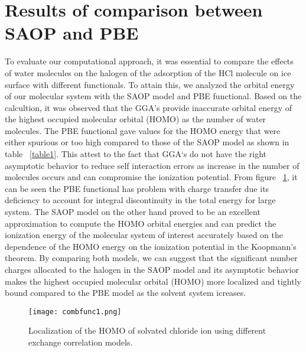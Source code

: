 \documentclass[a4paper,11pt]{report}
\begin{document}
\section{Results of comparison between SAOP and PBE}
To evaluate our computational approach, it was essential to compare the effects of water molecules on the halogen of the adsorption of  the HCl molecule on ice surface with different functionals. To attain this, we analyzed the orbital energy of our molecular system with the SAOP model and PBE functional. Based on the calcultion, it was observed that the GGA's provide inaccurate orbital energy of the highest occupied molecular orbital (HOMO) as the number of water molecules. The PBE functional gave values for the HOMO energy that were either spurious or too high compared to those of the SAOP model as shown in table ~\ref{table1}. This attest to the fact that GGA`s do not have the right asymptotic behavior to reduce self interaction errors as increase in the number of molecules occurs and can compromise the ionization potential. From figure ~\ref{figure0}, it can be seen the PBE functional has problem with charge transfer due its deficiency to account for integral discontinuity in the total energy for large system. The SAOP model on the other hand proved to be an excellent approximation to compute the HOMO orbital energies and can predict the ionization energy of the molecular system of interest accurately based on the dependence of the HOMO energy on the ionization potential in the Koopmann's theorem. By comparing both models, we can suggest that the significant number charges allocated to the halogen in the SAOP  model and its asymptotic behavior makes the highest occupied molecular orbital (HOMO) more localized and tightly bound compared to the PBE model as the solvent system icreases. 

\begin{figure}[H]\large
\texttt{[image: combfunc1.png]}
\caption{Localization of the HOMO of solvated chloride ion using different exchange correlation models.}
\label{figure0}
\end{figure}
\end{document}
